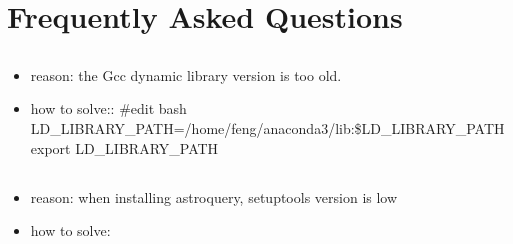 \documentclass[letterpaper,10pt,english]{sphinxmanual}
\begin{document}
\section{Frequently Asked Questions}
\label{\detokenize{faq:frequently-asked-questions}}\label{\detokenize{faq::doc}}

\subsection{}
\label{\detokenize{faq:importerror-lib64-libstdc-so-6}}\begin{itemize}
\item {} 
reason: the Gcc dynamic library version is too old.

\item {} 
how to solve::
\#edit bash
LD\_LIBRARY\_PATH=/home/feng/anaconda3/lib:\$LD\_LIBRARY\_PATH
export LD\_LIBRARY\_PATH

\end{itemize}


\subsection{}
\label{\detokenize{faq:error-setuptools-1-0-or-later-is-required-by-astropy-helpers}}\begin{itemize}
\item {} 
reason: when installing astroquery, setuptools version is low

\item {} 
how to solve:

\begin{sphinxVerbatim}[commandchars=\\\{\}]
 

\end{sphinxVerbatim}

\end{itemize}
\end{document}
